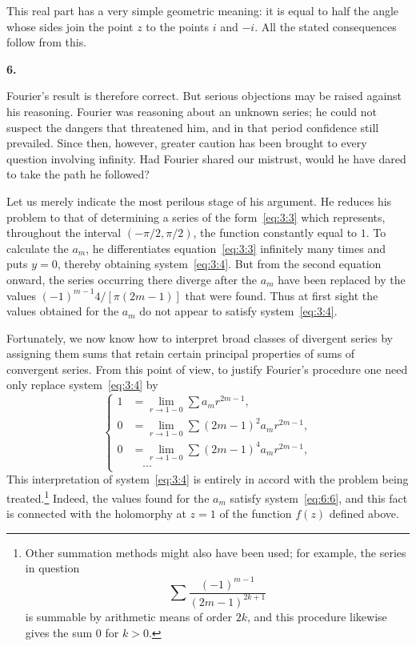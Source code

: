 \documentclass[
  paper=b5,
  fontsize=13pt,
  twoside=true,
  open=any,
  bookmarkpackage=false,
  chapterprefix=true,
  headings=normal
]{scrbook}
\theoremstyle{definition}
\newcommand{\numberedparagraph}[1]{%
  \par\medskip\phantomsection\label{sec:#1}%
  \noindent\textbf{#1.}\enspace
}
\begin{document}
This real part has a very simple geometric meaning: it is equal to half the angle whose sides join the point $z$ to the points $i$ and $-i$. All the stated consequences follow from this.

\numberedparagraph{6}
Fourier's result is therefore correct. But serious objections may be raised against his reasoning. Fourier was reasoning about an unknown series; he could not suspect the dangers that threatened him, and in that period confidence still prevailed. Since then, however, greater caution has been brought to every question involving infinity. Had Fourier shared our mistrust, would he have dared to take the path he followed?

Let us merely indicate the most perilous stage of his argument. He reduces his problem to that of determining a series of the form~\eqref{eq:3:3} which represents, throughout the interval $(-\pi/2,\pi/2)$, the function constantly equal to $1$. To calculate the $a_m$, he differentiates equation~\eqref{eq:3:3} infinitely many times and puts $y=0$, thereby obtaining system~\eqref{eq:3:4}. But from the second equation onward, the series occurring there diverge after the $a_m$ have been replaced by the values $(-1)^{m-1}4/[\pi(2m-1)]$ that were found. Thus at first sight the values obtained for the $a_m$ do not appear to satisfy system~\eqref{eq:3:4}.

Fortunately, we now know how to interpret broad classes of divergent series by assigning them sums that retain certain principal properties of sums of convergent series. From this point of view, to justify Fourier's procedure one need only replace system~\eqref{eq:3:4} by
\begin{equation}
\left\{
\begin{aligned}
  1&=\lim_{r\to1-0}\sum a_m r^{2m-1},\\
  0&=\lim_{r\to1-0}\sum(2m-1)^2a_m r^{2m-1},\\
  0&=\lim_{r\to1-0}\sum(2m-1)^4a_m r^{2m-1},\\
  &\hspace{1em}\cdots
\end{aligned}
\right.
\tag{6}\label{eq:6:6}
\end{equation}
This interpretation of system~\eqref{eq:3:4} is entirely in accord with the problem being treated.\footnote{Other summation methods might also have been used; for example, the series in question
\[
  \sum\frac{(-1)^{m-1}}{(2m-1)^{2k+1}}
\]
is summable by arithmetic means of order $2k$, and this procedure likewise gives the sum $0$ for $k>0$.} Indeed, the values found for the $a_m$
satisfy system~\eqref{eq:6:6}, and this fact is connected with the holomorphy at $z=1$ of the function $f(z)$ defined above.
\end{document}
